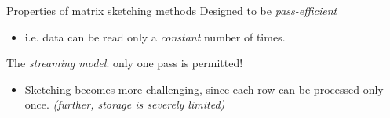\documentclass[first=dgreen,second=purple,logo=redque]{aaltoslides}
\begin{document}

\begin{frame}{Properties of matrix sketching methods}
Designed to be \textit{pass-efficient}
\begin{itemize}
	\item i.e. data can be read only a \textit{constant} number of times.
\end{itemize}
The \textit{streaming model}: only one pass is permitted!
\begin{itemize}
	\item Sketching becomes more challenging, since each row can be processed only
	once. \emph{(further, storage is severely limited)}
\end{itemize}

\end{frame}

\end{document}
